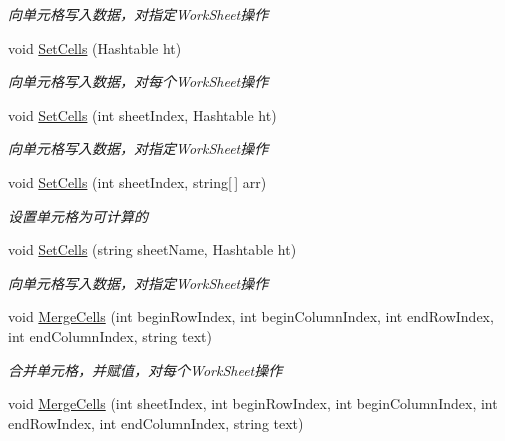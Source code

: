 \begin{DoxyCompactItemize}
\begin{DoxyCompactList}\small\item\em 向单元格写入数据，对指定\-Work\-Sheet操作 \end{DoxyCompactList}\item 
void \hyperlink{class_x_c_l_net_tools_1_1_office_1_1_excel_handler_1_1_excel_helper_acd5e584cc8280620cd132f2e92a2c464}{Set\-Cells} (Hashtable ht)
\begin{DoxyCompactList}\small\item\em 向单元格写入数据，对每个\-Work\-Sheet操作 \end{DoxyCompactList}\item 
void \hyperlink{class_x_c_l_net_tools_1_1_office_1_1_excel_handler_1_1_excel_helper_a3f5cd938e43939ab228512488ee5c843}{Set\-Cells} (int sheet\-Index, Hashtable ht)
\begin{DoxyCompactList}\small\item\em 向单元格写入数据，对指定\-Work\-Sheet操作 \end{DoxyCompactList}\item 
void \hyperlink{class_x_c_l_net_tools_1_1_office_1_1_excel_handler_1_1_excel_helper_adc471403ad84fed9a9cadbc25eda8ecf}{Set\-Cells} (int sheet\-Index, string\mbox{[}$\,$\mbox{]} arr)
\begin{DoxyCompactList}\small\item\em 设置单元格为可计算的 \end{DoxyCompactList}\item 
void \hyperlink{class_x_c_l_net_tools_1_1_office_1_1_excel_handler_1_1_excel_helper_a252fb1aa0a592429ffa639943ef6752f}{Set\-Cells} (string sheet\-Name, Hashtable ht)
\begin{DoxyCompactList}\small\item\em 向单元格写入数据，对指定\-Work\-Sheet操作 \end{DoxyCompactList}\item 
void \hyperlink{class_x_c_l_net_tools_1_1_office_1_1_excel_handler_1_1_excel_helper_a7602a33dbb3ee6cfbbf4a66e6106bd78}{Merge\-Cells} (int begin\-Row\-Index, int begin\-Column\-Index, int end\-Row\-Index, int end\-Column\-Index, string text)
\begin{DoxyCompactList}\small\item\em 合并单元格，并赋值，对每个\-Work\-Sheet操作 \end{DoxyCompactList}\item 
void \hyperlink{class_x_c_l_net_tools_1_1_office_1_1_excel_handler_1_1_excel_helper_a6285e410acdeec87d53f8720b1366d2a}{Merge\-Cells} (int sheet\-Index, int begin\-Row\-Index, int begin\-Column\-Index, int end\-Row\-Index, int end\-Column\-Index, string text)

\end{DoxyCompactItemize}
